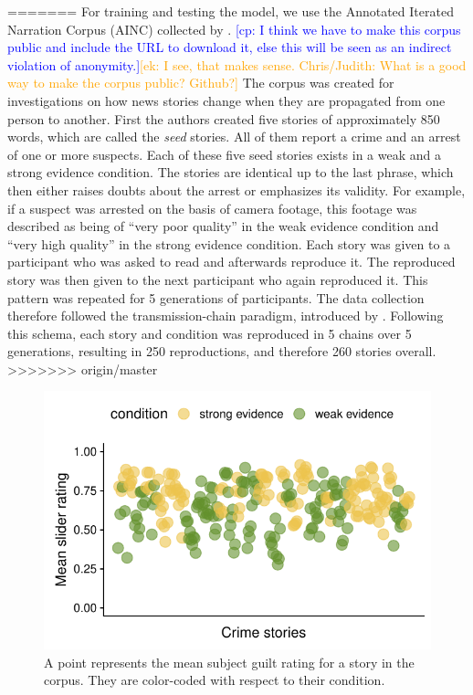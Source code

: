 \documentclass[11pt,a4paper]{article}
\newcommand{\ek}[1]{\textcolor{Orange}{[ek: #1]}}
\newcommand{\cp}[1]{\textcolor{Blue}{[cp: #1]}}
\begin{document}
=======
For training and testing the model, we use the Annotated Iterated Narration Corpus (AINC) collected by \cite{Kreiss:2019}. \cp{I think we have to make this corpus public and include the URL to download it, else this will be seen as an indirect violation of anonymity.}\ek{I see, that makes sense. Chris/Judith: What is a good way to make the corpus public? Github?} The corpus was created for investigations on how news stories change when they are propagated from one person to another. First the authors created five stories of approximately 850 words, which are called the \emph{seed} stories. All of them report a crime and an arrest of one or more suspects. Each of these five seed stories exists in a weak and a strong evidence condition. The stories are identical up to the last phrase, which then either raises doubts about the arrest or emphasizes its validity. For example, if a suspect was arrested on the basis of camera footage, this footage was described as being of ``very poor quality'' in the weak evidence condition and ``very high quality'' in the strong evidence condition. Each story was given to a participant who was asked to read and afterwards reproduce it. The reproduced story was then given to the next participant who again reproduced it. This pattern was repeated for 5 generations of participants. The data collection therefore followed the transmission-chain paradigm, introduced by \cite{Bartlett:1932}. Following this schema, each story and condition was reproduced in 5 chains over 5 generations, resulting in 250 reproductions, and therefore 260 stories overall. %
>>>>>>> origin/master


\begin{figure}[t!]
	\includegraphics[width=\linewidth]{graphs/subjguilt.pdf}
	\caption{A point represents the mean subject guilt rating for a story in the corpus. They are color-coded with respect to their condition.}
	\label{fig:corpus-annotations}
\end{figure}
\end{document}
